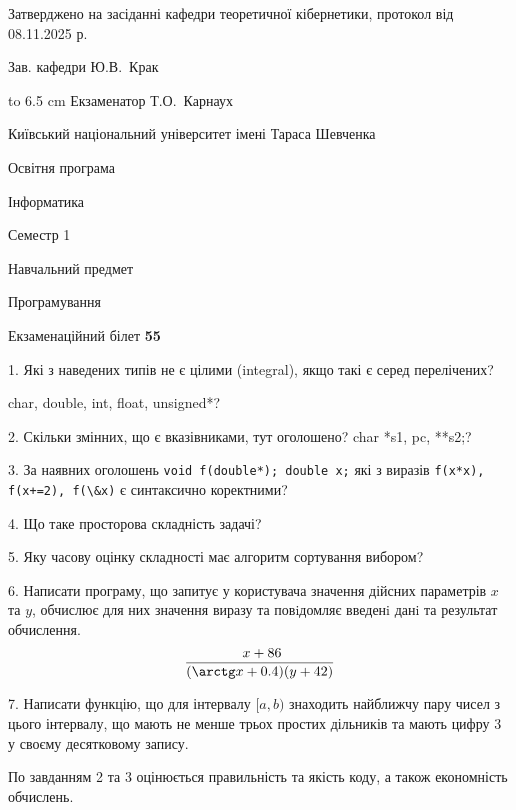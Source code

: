 \documentclass[12pt, ukrainian]{article}
\def\code#1{\Verb!#1!}
\begin{document}
{\smallskip\smallskip \begin {scriptsize} Затверджено на засіданні кафедри теоретичної кібернетики, протокол   від   08.11.2025 р.\par\smallskip\smallskip\smallskip\smallskip
{\parbox {6.5 cm} {Зав. кафедри \dotfill Ю.В.~Крак}}\hspace {0.7cm} {\hbox to 6.5 cm { Екзаменатор \dotfill Т.О.~Карнаух}} \end{scriptsize}}
\newpage
{{\begin {scriptsize}\par
{ \center  Київський національний університет імені Тараса Шевченка \par}
{\parbox {5 cm}{Освітня програма \hfill}{\parbox {7 cm}{Інформатика\hfill}}\parbox {6 cm}{\hfill Семестр 1}}\par
{\parbox {5 cm} {Навчальний предмет \hfill}\parbox {7 cm}{Програмування \hfill}\parbox {6cm}{\hfill}\par}\vspace{-15pt} \end{scriptsize}}{\center Екзаменаційний білет \No \textbf { 55 }\par}}
{%
1. Які з наведених типів не є цілими (integral), якщо такі є серед перелічених?

char, double, int, float, unsigned*?
\par
\vspace{2mm}
2. Скільки змінних, що є вказівниками, тут оголошено?
char *s1, pc, **s2;?
\par
\vspace{2mm}
3. За наявних оголошень \code{void f(double*); double x;} які з виразів \code{f(x*x), f(x+=2), f(\&x)} є синтаксично коректними?
\par
\vspace{2mm}
4. Що таке просторова складність задачі?
\par
\vspace{2mm}
5. Яку часову оцінку складності має алгоритм сортування вибором?
\par
\vspace{2mm}
6. Написати програму, що запитує у користувача значення дійсних параметрів $x$ та $y$, обчислює для них значення виразу та повiдомляє введенi данi та результат обчислення.
$$\frac{\ x + 86}{(\arctg x + 0.4) (y + 42)}$$ 

\par
7. Написати функцію, що для інтервалу $[a, b)$ знаходить найближчу пару чисел з цього інтервалу, що мають не менше трьох простих дільників та мають цифру 3 у своєму десятковому запису.

По завданням 2 та 3 оцінюється правильність та якість коду, а також економність обчислень.

}
\end{document}
